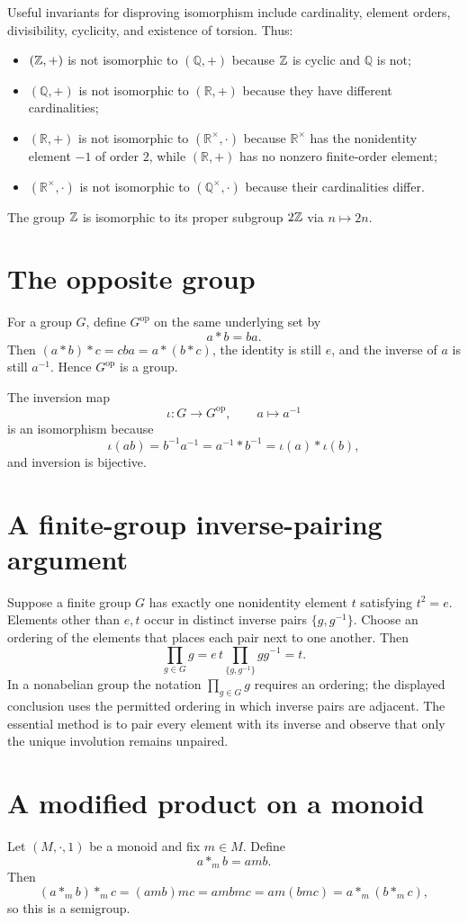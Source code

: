 \documentclass[11pt,openany]{book}
\newcommand{\Q}{\mathbb Q}\newcommand{\R}{\mathbb R}
\theoremstyle{definition}
\begin{document}
Useful invariants for disproving isomorphism include cardinality, element orders, divisibility, cyclicity, and existence of torsion. Thus:
\begin{itemize}
\item $(\mathbb Z,+)$ is not isomorphic to $(\Q,+)$ because $\mathbb Z$ is cyclic and $\Q$ is not;
\item $(\Q,+)$ is not isomorphic to $(\R,+)$ because they have different cardinalities;
\item $(\R,+)$ is not isomorphic to $(\R^\times,\cdot)$ because $\R^\times$ has the nonidentity element $-1$ of order $2$, while $(\R,+)$ has no nonzero finite-order element;
\item $(\R^\times,\cdot)$ is not isomorphic to $(\Q^\times,\cdot)$ because their cardinalities differ.
\end{itemize}

The group $\mathbb Z$ is isomorphic to its proper subgroup $2\mathbb Z$ via $n\mapsto2n$.

\section{The opposite group}
For a group $G$, define $G^{\mathrm{op}}$ on the same underlying set by
\[
a*b=ba.
\]
Then $(a*b)*c=cba=a*(b*c)$, the identity is still $e$, and the inverse of $a$ is still $a^{-1}$. Hence $G^{\mathrm{op}}$ is a group.

The inversion map
\[
\iota:G\longrightarrow G^{\mathrm{op}},\qquad a\longmapsto a^{-1}
\]
is an isomorphism because
\[
\iota(ab)=b^{-1}a^{-1}=a^{-1}*b^{-1}=\iota(a)*\iota(b),
\]
and inversion is bijective.

\section{A finite-group inverse-pairing argument}
Suppose a finite group $G$ has exactly one nonidentity element $t$ satisfying $t^2=e$. Elements other than $e,t$ occur in distinct inverse pairs $\{g,g^{-1}\}$. Choose an ordering of the elements that places each pair next to one another. Then
\[
\prod_{g\in G}g
=e\,t\prod_{\{g,g^{-1}\}}gg^{-1}=t.
\]
In a nonabelian group the notation $\prod_{g\in G}g$ requires an ordering; the displayed conclusion uses the permitted ordering in which inverse pairs are adjacent. The essential method is to pair every element with its inverse and observe that only the unique involution remains unpaired.

\section{A modified product on a monoid}
Let $(M,\cdot,1)$ be a monoid and fix $m\in M$. Define
\[
a*_m b=amb.
\]
Then
\[
(a*_m b)*_m c=(amb)mc=ambmc=a m(bmc)=a*_m(b*_m c),
\]
so this is a semigroup.
\end{document}

